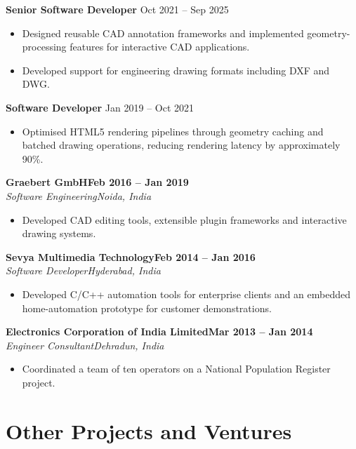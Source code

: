 \documentclass[10pt,a4paper]{article}
\newcommand{\cventry}[4]{
    \textbf{#1}\hfill\textbf{#2}\\
    \textit{#3}\hfill\textit{#4}
    \par
}
\begin{document}
\textbf{Senior Software Developer}
\hfill Oct 2021 -- Sep 2025

\begin{itemize}
    \item Designed reusable CAD annotation
    frameworks and implemented geometry-processing
    features for interactive CAD applications.

    \item Developed support for engineering
    drawing formats including DXF and DWG.
\end{itemize}

\textbf{Software Developer}
\hfill Jan 2019 -- Oct 2021

\begin{itemize}
    \item Optimised HTML5 rendering pipelines
    through geometry caching and batched
    drawing operations, reducing rendering
    latency by approximately 90\%.
\end{itemize}

\cventry
    {Graebert GmbH}
    {Feb 2016 -- Jan 2019}
    {Software Engineering}
    {Noida, India}

\begin{itemize}
    \item Developed CAD editing tools,
    extensible plugin frameworks and
    interactive drawing systems.
\end{itemize}

\cventry
    {Sevya Multimedia Technology}
    {Feb 2014 -- Jan 2016}
    {Software Developer}
    {Hyderabad, India}

\begin{itemize}
    \item Developed C/C++ automation tools
    for enterprise clients and an embedded
    home-automation prototype for
    customer demonstrations.
\end{itemize}

\cventry
    {Electronics Corporation of India Limited}
    {Mar 2013 -- Jan 2014}
    {Engineer Consultant}
    {Dehradun, India}

\begin{itemize}
    \item Coordinated a team of ten operators
    on a National Population Register project.
\end{itemize}


\section*{Other Projects and Ventures}
\end{document}
